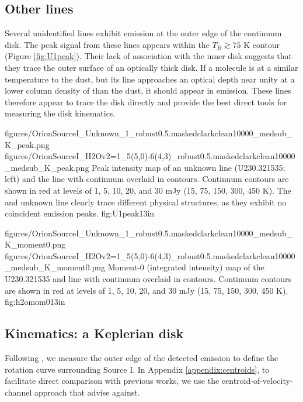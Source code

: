 \documentclass[twocolumn]{aastex61}
\begin{document}

\subsection{Other lines}
Several unidentified lines exhibit emission at the outer edge of the continuum disk.
The peak signal from these lines appears within the $T_B\gtrsim75$ K contour
(Figure \ref{fig:U1peak}).
Their lack of association with the inner disk suggests that they trace the outer
surface of an optically thick disk.
If a molecule is at a similar temperature to the dust, but its line approaches
an optical depth near unity at a lower column density of \hh than the dust,
it should appear in emission.  These lines therefore appear to trace the disk
directly and provide the best direct tools for measuring the disk kinematics.

\FigureTwo
{{figures/OrionSourceI_Unknown_1_robust0.5.maskedclarkclean10000_medsub_K_peak}.png}
{{figures/OrionSourceI_H2Ov2=1_5(5,0)-6(4,3)_robust0.5.maskedclarkclean10000_medsub_K_peak}.png}
{Peak intensity map of an unknown line (U230.321535; left) and the \water
line with continuum overlaid
in contours.  Continuum contours are shown in red at levels of 1, 5, 10, 20, and 30
mJy \perbeam (15, 75, 150, 300, 450 K).
The \water and unknown line clearly trace different physical structures, as
they exhibit no coincident emission peaks.
}
{fig:U1peak}{1}{3in}

\FigureTwo
{{figures/OrionSourceI_Unknown_1_robust0.5.maskedclarkclean10000_medsub_K_moment0}.png}
{{figures/OrionSourceI_H2Ov2=1_5(5,0)-6(4,3)_robust0.5.maskedclarkclean10000_medsub_K_moment0}.png}
{Moment-0 (integrated intensity) map of the U230.321535 and \water line with continuum overlaid
in contours.  Continuum contours are shown in red at levels of 1, 5, 10, 20, and 30
mJy \perbeam (15, 75, 150, 300, 450 K).
}
{fig:h2omom0}{1}{3in}

\subsection{Kinematics: a Keplerian disk}
\label{sec:kinematics}
Following \citet{Seifried2016a}, we measure the outer edge of the detected
emission to define the rotation curve surrounding Source I.  In Appendix
\ref{appendix:centroids}, to facilitate direct comparison with previous works,
we use the centroid-of-velocity-channel approach that \citet{Seifried2016a}
advise against.
\end{document}
